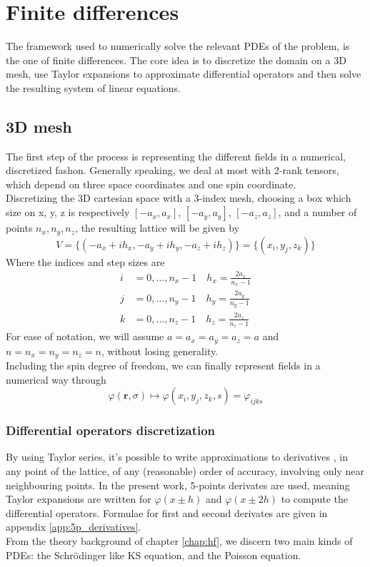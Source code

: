 \section{Finite differences}
\label{sec:finite_diff}
The framework used to numerically solve the relevant PDEs of the problem, is the one of finite differences. The core idea is to discretize the domain on a 3D mesh, use Taylor expansions to approximate differential operators and then solve the resulting system of linear equations.
\subsection{3D mesh}
The first step of the process is representing the different fields in a numerical, discretized fashon.
Generally speaking, we deal at most with 2-rank tensors, which depend on three space coordinates and one spin coordinate.
\\Discretizing the 3D cartesian space with a 3-index mesh, choosing a box which size on x, y, z is respectively $[-a_x, a_x]$, $[-a_y, a_y]$, $[-a_z, a_z]$, and a number of points $n_x, n_y, n_z$, the resulting lattice will be given by
\begin{equation*}
V=\{(-a_x+ih_x, -a_y+ih_y, -a_z+ih_z)\} = \{(x_i, y_j,z_k)\} 
\end{equation*}
Where the indices and step sizes are
\begin{align*}
  i&=0,\ldots,n_x-1\quad h_x = \frac{2a_x}{n_x-1}\\
  j&=0,\ldots,n_y-1\quad h_y = \frac{2a_y}{n_y-1}\\
  k&=0,\ldots,n_z-1\quad h_z = \frac{2a_z}{n_z-1}
\end{align*}
For ease of notation, we will assume $a=a_x=a_y=a_z=a$ and $n=n_x=n_y=n_z=n$, without losing generality.
\\Including the spin degree of freedom, we can finally represent fields in a numerical way through
\begin{equation}
    \varphi(\bm r, \sigma) \mapsto \varphi(x_i, y_j, z_k, s) = \varphi_{ijks}
\end{equation}
\subsubsection{Differential operators discretization}
By using Taylor series, it's possible to write approximations to derivatives \cite{Zhou1993}, in any point of the lattice, of any (reasonable) order of accuracy, involving only near neighbouring points. In the present work, 5-points derivates are used, meaning Taylor expansions are written for $\varphi(x\pm h)$ and $\varphi(x\pm 2h)$ to compute the differential operators. Formulae for first and second derivates are given in appendix \ref{app:5p_derivatives}.
\\From the theory background of chapter \ref{chap:hf}, we discern two main kinds of PDEs: the Schr\"odinger like KS equation, and the Poisson equation.
